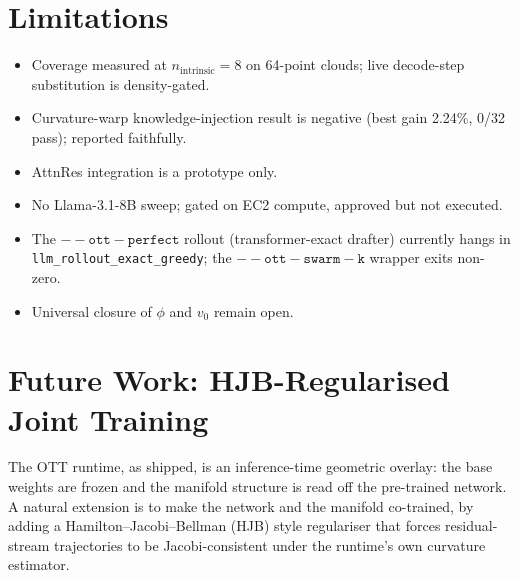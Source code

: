 \documentclass[11pt]{article}
\begin{document}
\section{Limitations}

\begin{itemize}
  \item Coverage measured at $n_{\mathrm{intrinsic}}=8$ on 64-point clouds;
        live decode-step substitution is density-gated.
  \item Curvature-warp knowledge-injection result is negative (best
        gain 2.24\%, 0/32 pass); reported faithfully.
  \item AttnRes integration is a prototype only.
  \item No Llama-3.1-8B sweep; gated on EC2 compute, approved but not
        executed.
  \item The $\mathtt{-{}-ott-perfect}$ rollout (transformer-exact drafter)
        currently hangs in \texttt{llm\_rollout\_exact\_greedy}; the
        $\mathtt{-{}-ott-swarm-k}$ wrapper exits non-zero.
  \item Universal closure of $\phi$ and $v_0$ remain open.
\end{itemize}

\section{Future Work: HJB-Regularised Joint Training}
\label{sec:hjb-future}

The OTT runtime, as shipped, is an inference-time geometric overlay: the
base weights are frozen and the manifold structure is read off the
pre-trained network.  A natural extension is to make the network and the
manifold co-trained, by adding a Hamilton--Jacobi--Bellman (HJB)
style regulariser that forces residual-stream trajectories to be
Jacobi-consistent under the runtime's own curvature estimator.
\end{document}
